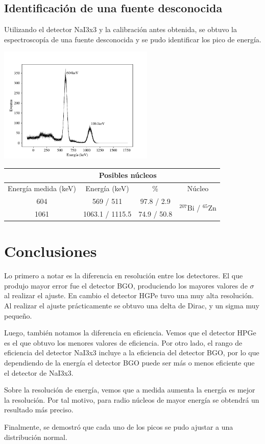 \documentclass[a4paper, onecolumn]{article}
\begin{document}
		\subsection{Identificación de una fuente desconocida}
		Utilizando el detector NaI3x3 y la calibración antes obtenida, se obtuvo la espectroscopía de una fuente desconocida y se pudo identificar los pico de energía.
		\begin{center}
			\includegraphics[width=210pt]{img/unknown_source.pdf}
		\end{center}
		\begin{center}
			{\renewcommand{\arraystretch}{1.5}
			\renewcommand{\tabcolsep}{0.2cm}
			\label{table_energy_resolution}
			\begin{tabular}{ c c c c }
				\hline
				& \multicolumn{2}{c}{Posibles núcleos} \\
				\hline
				Energía medida (keV) & Energía (keV) & \% & Núcleo \\
				\hline
				604 & 569 / 511 & 97.8 / 2.9 & \multirow{2}{*}{${}^{207}\mathrm{Bi}$ / ${}^{65}\mathrm{Zn}$}  \\
				1061 & 1063.1 / 1115.5 & 74.9 / 50.8 &  \\
				\hline
			\end{tabular}}
		\end{center}
	\section{Conclusiones}
		Lo primero a notar es la diferencia en resolución entre los detectores. El que produjo mayor error fue el detector BGO, produciendo los mayores valores de $\sigma$ al realizar el ajuste. En cambio el detector HGPe tuvo una muy alta resolución. Al realizar el ajuste prácticamente se obtuvo una delta de Dirac, y un sigma muy pequeño.

		Luego, también notamos la diferencia en eficiencia. Vemos que el detector HPGe es el que obtuvo los menores valores de eficiencia. Por otro lado, el rango de eficiencia del detector NaI3x3 incluye a la eficiencia del detector BGO, por lo que dependiendo de la energía el detector BGO puede ser más o menos eficiente que el detector de NaI3x3.

		Sobre la resolución de energía, vemos que a medida aumenta la energía es mejor la resolución. Por tal motivo, para radio núcleos de mayor energía se obtendrá un resultado más preciso.

		Finalmente, se demostró que cada uno de los picos se pudo ajustar a una distribución normal.
	
	
\end{document}
